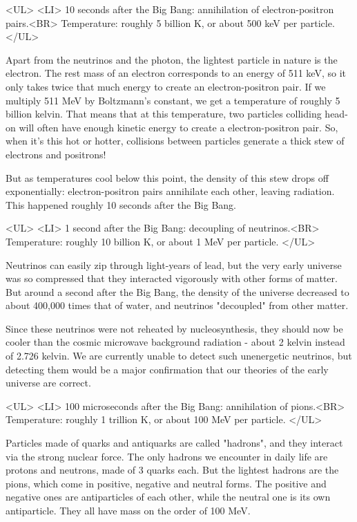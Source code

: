 <UL>
<LI>
10 seconds after the Big Bang: annihilation of electron-positron pairs.<BR>
Temperature: roughly 5 billion K, or about 500 keV per particle.
</UL>

Apart from the neutrinos and the photon, the lightest particle in
nature is the electron.  The rest mass of an electron corresponds to
an energy of 511 keV, so it only takes twice that much energy to
create an electron-positron pair.  If we multiply 511 MeV by
Boltzmann's constant, we get a temperature of roughly 5 billion
kelvin.  That means that at this temperature, two particles colliding
head-on will often have enough kinetic energy to create a
electron-positron pair.  So, when it's this hot or hotter, collisions
between particles generate a thick stew of electrons and positrons!

But as temperatures cool below this point, the density of this stew
drops off exponentially: electron-positron pairs annihilate each
other, leaving radiation.  This happened roughly 10 seconds after the
Big Bang.

<UL>
<LI>
1 second after the Big Bang: decoupling of neutrinos.<BR>
Temperature: roughly 10 billion K, or about 1 MeV per particle.
</UL>

Neutrinos can easily zip through light-years of lead, but the very
early universe was so compressed that they interacted vigorously with
other forms of matter.  But around a second after the Big Bang, the
density of the universe decreased to about 400,000 times that of
water, and neutrinos "decoupled" from other matter.  

Since these neutrinos were not reheated by nucleosynthesis, they
should now be cooler than the cosmic microwave background radiation -
about 2 kelvin instead of 2.726 kelvin.  We are currently unable to
detect such unenergetic neutrinos, but detecting them would be a major
confirmation that our theories of the early universe are correct.

<UL>
<LI>
100 microseconds after the Big Bang: annihilation of pions.<BR>
Temperature: roughly 1 trillion K, or about 100 MeV per particle.
</UL>

Particles made of quarks and antiquarks are called
"hadrons", and they interact via the strong nuclear force.
The only hadrons we encounter in daily life are protons and neutrons,
made of 3 quarks each.  But the lightest hadrons are the pions, which
come in positive, negative and neutral forms.  The positive and
negative ones are antiparticles of each other, while the neutral one
is its own antiparticle.  They all have mass on the order of 100 MeV.

